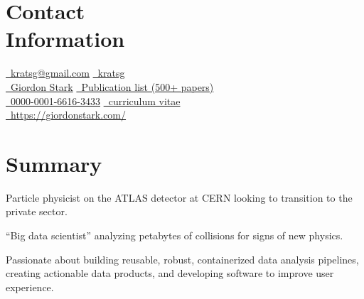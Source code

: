 \documentclass[margin,line]{resume}
\begin{document}
\begin{resume}

\section{\mysidestyle Contact\\Information}

\href{mailto:kratsg@gmail.com}{\faEnvelope~kratsg@gmail.com} \hfill \href{https://github.com/kratsg}{\faGithub~kratsg}
\vspace{0mm}\\\vspace{0mm}%
\href{https://www.linkedin.com/in/giordon-stark-5576b71b/}{\faLinkedin~Giordon Stark}  \hfill \href{https://inspirehep.net/literature?sort=mostrecent&size=25&page=1&q=a+g+ stark}{\aiADS~Publication list (500+ papers)}
\vspace{0mm}\\\vspace{0mm}%
\href{https://orcid.org/0000-0001-6616-3433}{\aiOrcid~0000-0001-6616-3433} \hfill \href{https://kratsg.github.io/cv/cv_GiordonStark.pdf}{\faFileText~curriculum vitae}
\vspace{0mm}\\\vspace{0mm}%
\href{https://giordonstark.com/?utm_source=resume}{\faHome~https://giordonstark.com/} \hfill \\
\vspace{-8.0mm}%

\section{\mysidestyle Summary}
\begin{list2}
  \small
  \item Particle physicist on the ATLAS detector at CERN looking to transition to the private sector.
  \item ``Big data scientist'' analyzing petabytes of collisions for signs of new physics.
  \item Passionate about building reusable, robust, containerized data analysis pipelines, creating actionable data products, and developing software to improve user experience.
\end{list2}


\end{resume}
\end{document}
